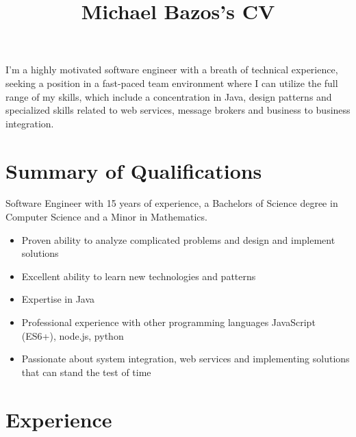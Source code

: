 \documentclass[a4paper,online]{adcv}
\title{Michael Bazos’s CV}
\begin{document}
I’m a highly motivated software engineer with a breath of technical experience, seeking a position in a fast-paced team environment where I can utilize the full range of my skills, which include a concentration in Java, design patterns and specialized skills related to web services, message brokers and business to business integration.

\section{Summary of Qualifications}

\begin{adcvtabletwo}
Software Engineer with 15 years of experience, a Bachelors of Science degree in Computer Science and a Minor in Mathematics.
  \begin{itemize}
    \item Proven ability to analyze complicated problems and design and implement solutions
    \item Excellent ability to learn new technologies and patterns
    \item Expertise in Java
    \item Professional experience with other programming languages JavaScript (ES6+), node.js, python 
    \item Passionate about system integration, web services and implementing solutions that can stand the test of time
  \end{itemize}
\end{adcvtabletwo}

\section{Experience}
\end{document}
